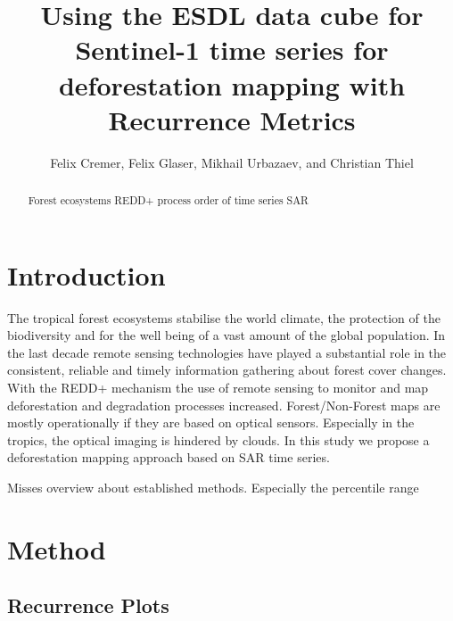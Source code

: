 \documentclass{article}
\title{Using the ESDL data cube for Sentinel-1 time series for deforestation mapping with Recurrence Metrics}
\author{Felix Cremer, Felix Glaser, Mikhail Urbazaev, and Christian Thiel}
\begin{document}
\maketitle
\begin{abstract}
  Forest ecosystems
  REDD+ process
  order of time series
  SAR

%
\end{abstract}
\section{Introduction}
The tropical forest ecosystems stabilise the world climate\cite{},
the protection of the biodiversity \cite{} and
for the well being of a vast amount of the global population\cite{}.
In the last decade remote sensing technologies have
played a substantial role in the consistent,
reliable and timely information gathering about forest cover changes.
With the REDD+ mechanism the use of remote sensing to monitor
and map deforestation and degradation processes increased.
Forest/Non-Forest maps are mostly operationally
if they are based on optical sensors. Especially in the tropics,
the optical imaging is hindered by clouds.
In this study we  propose a deforestation mapping approach based on SAR time
series.

Misses overview about established methods.
Especially the percentile range

\section{Method}

\subsection{Recurrence Plots}
\end{document}
